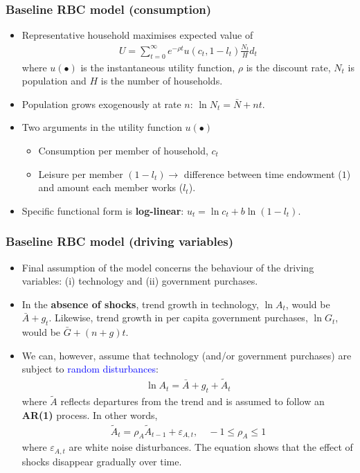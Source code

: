 \documentclass[10pt, handout]{beamer} %
\begin{document}
\begin{frame}
\frametitle{Baseline RBC model (consumption)}
\begin{itemize}[<+->]
\item Representative household maximises expected value of
\begin{align*}
U = {\sum_{t=0}^\infty}{e^{-\rho{t}}u(c_t, 1- l_{t})}{\frac{N_t}{H}}{d_t}
\end{align*}
where $u(\bullet)$ is the instantaneous utility function, $\rho$ is the discount rate, $N_{t}$ is population and $H$ is the number of households.
\item Population grows exogenously at rate $n$: $\ln{N_{t}} = \bar{N} + nt$.
\vspace{2mm}
\item Two arguments in the utility function $u(\bullet)$
\begin{itemize}
  \item Consumption per member of household, $c_{t}$
  \item Leisure per member $(1 - l_{t}) \rightarrow$ difference between time endowment ($1$) and amount each member works ($l_{t}$).
\end{itemize}
\vspace{2mm}
\item Specific functional form is \textbf{log-linear}: $u_{t} = \ln{c_{t}} + b\ln({1-l_{t}})$.
\end{itemize}
\end{frame}


\begin{frame}
\frametitle{Baseline RBC model (driving variables)}
\begin{itemize}[<+->]
\item Final assumption of the model concerns the behaviour of the driving variables: (i) technology and (ii) government purchases.
\vspace{3mm}
\item In the \textbf{absence of shocks}, trend growth in technology, $\ln{A_{t}}$, would be $\bar{A} + g_{t}$. Likewise, trend growth in per capita government purchases, $\ln{G_{t}}$, would be $\bar{G} + (n+g)t$.
\vspace{2mm}
\item We can, however, assume that technology (and/or government purchases) are subject to \textcolor{blue}{random disturbances}:
\begin{align*}
\ln{A_{t}} = \bar{A} + g_{t} + \tilde{A}_{t}
\end{align*}
where $\tilde{A}$ reflects departures from the trend and is assumed to follow an \textbf{AR(1)} process. In other words,
\begin{align*}
\tilde{A}_{t} = \rho_{A}\tilde{A}_{t-1} + \varepsilon_{A,t}, \quad -1 \leq \rho_{A} \leq 1
\end{align*}
where $\varepsilon_{A,t}$ are white noise disturbances. The equation shows that the effect of shocks disappear gradually over time.
\end{itemize}
\end{frame}
\end{document}
